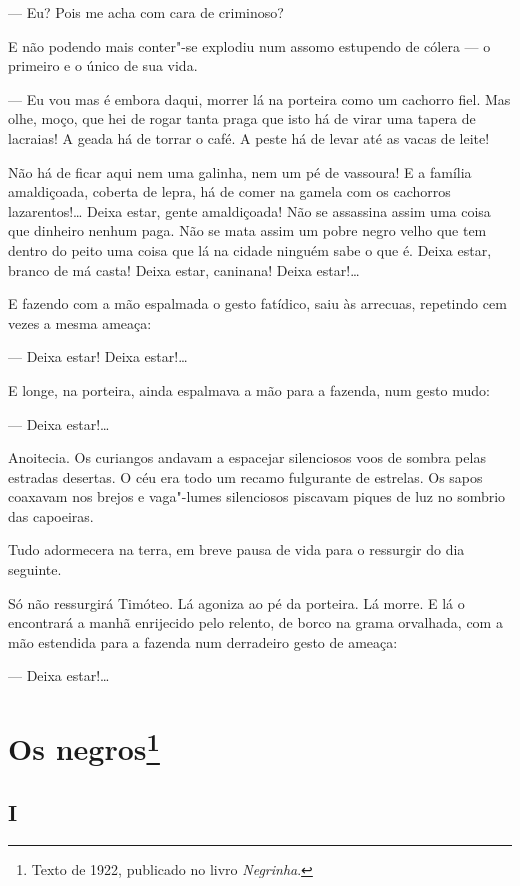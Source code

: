 --- Eu? Pois me acha com cara de criminoso?

E não podendo mais conter"-se explodiu num assomo estupendo de cólera ---
o primeiro e o único de sua vida.

--- Eu vou mas é embora daqui, morrer lá na porteira como um cachorro
fiel. Mas olhe, moço, que hei de rogar tanta praga que isto há de virar
uma tapera de lacraias! A geada há de torrar o café. A peste há de levar
até as vacas de leite!

Não há de ficar aqui nem uma galinha, nem um pé de vassoura! E a família
amaldiçoada, coberta de lepra, há de comer na gamela com os cachorros
lazarentos!\ldots{} Deixa estar, gente amaldiçoada! Não se assassina assim
uma coisa que dinheiro nenhum paga. Não se mata assim um pobre negro
velho que tem dentro do peito uma coisa que lá na cidade ninguém sabe o
que é. Deixa estar, branco de má casta! Deixa estar, caninana! Deixa
estar!\ldots{}

E fazendo com a mão espalmada o gesto fatídico, saiu às arrecuas,
repetindo cem vezes a mesma ameaça:

--- Deixa estar! Deixa estar!\ldots{}

E longe, na porteira, ainda espalmava a mão para a fazenda, num gesto
mudo:

--- Deixa estar!\ldots{}

Anoitecia. Os curiangos andavam a espacejar silenciosos voos de sombra
pelas estradas desertas. O céu era todo um recamo fulgurante de
estrelas. Os sapos coaxavam nos brejos e vaga"-lumes silenciosos piscavam
piques de luz no sombrio das capoeiras.

Tudo adormecera na terra, em breve pausa de vida para o ressurgir do dia
seguinte.

Só não ressurgirá Timóteo. Lá agoniza ao pé da porteira. Lá morre. E lá
o encontrará a manhã enrijecido pelo relento, de borco na grama
orvalhada, com a mão estendida para a fazenda num derradeiro gesto de
ameaça:

--- Deixa estar!\ldots{}

\chapter{Os negros\footnote[*]{Texto de 1922, publicado no livro \emph{Negrinha}.}}

\section*{I}

